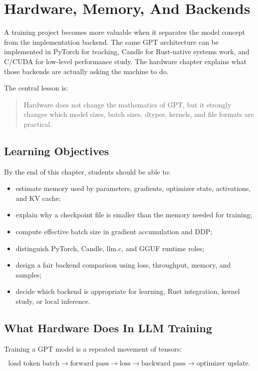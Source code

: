 \chapter{Hardware, Memory, And Backends}

A training project becomes more valuable when it separates the model concept from the
implementation backend. The same GPT architecture can be implemented in PyTorch for
teaching, Candle for Rust-native systems work, and C/CUDA for low-level performance
study. The hardware chapter explains what those backends are actually asking the machine
to do.

The central lesson is:

\begin{quote}
Hardware does not change the mathematics of GPT, but it strongly changes which model
sizes, batch sizes, dtypes, kernels, and file formats are practical.
\end{quote}

\section{Learning Objectives}

By the end of this chapter, students should be able to:

\begin{itemize}
  \item estimate memory used by parameters, gradients, optimizer state, activations, and
  KV cache;
  \item explain why a checkpoint file is smaller than the memory needed for training;
  \item compute effective batch size in gradient accumulation and DDP;
  \item distinguish PyTorch, Candle, llm.c, and GGUF runtime roles;
  \item design a fair backend comparison using loss, throughput, memory, and samples;
  \item decide which backend is appropriate for learning, Rust integration, kernel study,
  or local inference.
\end{itemize}

\section{What Hardware Does In LLM Training}

Training a GPT model is a repeated movement of tensors:

\[
\text{load token batch}
\rightarrow
\text{forward pass}
\rightarrow
\text{loss}
\rightarrow
\text{backward pass}
\rightarrow
\text{optimizer update}.
\]

